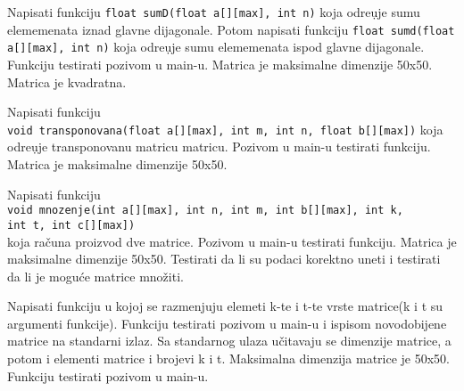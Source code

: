 \begin{Exercise}[label=p1.2_] 
Napisati funkciju \verb|float sumD(float a[][max], int n)| koja odre\d
uje sumu elememenata iznad glavne dijagonale. Potom napisati funkciju
\verb|float sumd(float a[][max], int n)| koja odre\d uje sumu
elememenata ispod glavne dijagonale.  Funkciju testirati pozivom u
main-u. Matrica je maksimalne dimenzije 50x50. Matrica je kvadratna.
\end{Exercise}
\begin{Answer}[ref=p1.2_]
\end{Answer}


\begin{Exercise}[label=p1.2_] 
Napisati
funkciju\\ \verb|void transponovana(float a[][max], int m, int n, float b[][max])|
koja odre\d uje transponovanu matricu matricu.  Pozivom u main-u
testirati funkciju. Matrica je maksimalne dimenzije 50x50.
\end{Exercise}
\begin{Answer}[ref=p1.2_]
\end{Answer}

\begin{Exercise}[label=p1.2_] 
Napisati funkciju\\
\verb|void mnozenje(int a[][max], int n, int m, int b[][max], int k,|\\
\verb|int t, int c[][max])|\\
koja ra\v cuna 
proizvod dve matrice. 
Pozivom u main-u testirati funkciju. Matrica je maksimalne dimenzije 50x50. Testirati da li su
podaci korektno uneti i testirati da li je mogu\'ce matrice mno\v ziti.
\end{Exercise}
\begin{Answer}[ref=p1.2_]
\end{Answer}


\begin{Exercise}[label=p1.2_] 
Napisati funkciju u kojoj se razmenjuju elemeti k-te i t-te vrste
matrice(k i t su argumenti funkcije). Funkciju testirati pozivom u
main-u i ispisom novodobijene matrice na standarni izlaz. Sa
standarnog ulaza u\v citavaju se dimenzije matrice, a potom i elementi
matrice i brojevi k i t. Maksimalna dimenzija matrice je
50x50. Funkciju testirati pozivom u main-u.
\end{Exercise}
\begin{Answer}[ref=p1.2_]
\end{Answer}


